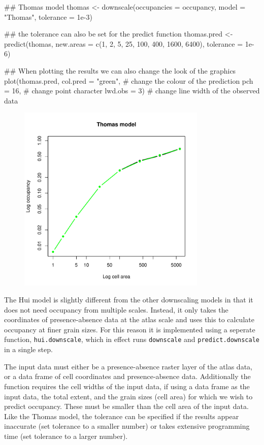 \documentclass{article}[12pt, a4paper]
\begin{document}
\begin{Schunk}
\begin{Sinput}
## Thomas model
thomas <- downscale(occupancies = occupancy,
                    model = "Thomas",
                    tolerance = 1e-3)
                    
## the tolerance can also be set for the predict function
thomas.pred <- predict(thomas,
                       new.areas = c(1, 2, 5, 25, 100, 400, 1600, 6400),
                       tolerance = 1e-6)

## When plotting the results we can also change the look of the graphics
plot(thomas.pred,
     col.pred = "green",  # change the colour of the prediction
     pch = 16,            # change point character
     lwd.obs = 3)         # change line width of the observed data
\end{Sinput}
\end{Schunk}
\begin{figure}[!ht]
\centering
\includegraphics[width=9cm]{Downscaling-downscale16}
\end{figure}

The Hui model is slightly different from the other downscaling models in that it does not need occupancy from multiple scales. Instead, it only takes the coordinates of presence-absence data at the atlas scale and uses this to calculate occupancy at finer grain sizes. For this reason it is implemented using a seperate function, \texttt{hui.downscale}, which in effect runs \texttt{downscale} and \texttt{predict.downscale} in a single step. 

The input data must either be a presence-absence raster layer of the atlas data, or a data frame of cell coordinates and presence-absence data. Additionally the function requires the cell widths of the input data, if using a data frame as the input data, the total extent, and the grain sizes (cell area) for which we wish to predict occupancy. These must be smaller than the cell area of the input data. Like the Thomas model, the tolerance can be specified if the results appear inaccurate (set tolerance to a smaller number) or takes extensive programming time (set tolerance to a larger number).
\end{document}
